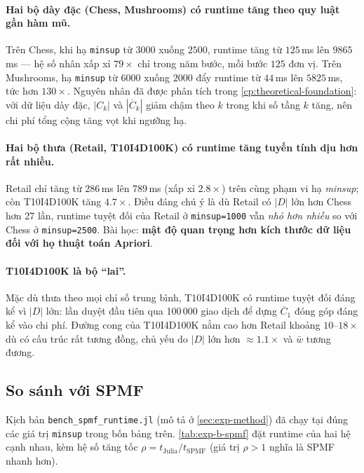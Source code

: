\paragraph{Hai bộ dày đặc (Chess, Mushrooms) có runtime tăng theo quy luật gần hàm mũ.} Trên Chess, khi hạ \texttt{minsup} từ $3000$ xuống $2500$, runtime tăng từ $125$\,ms lên $9865$\,ms --- hệ số nhân xấp xỉ $79\times$ chỉ trong năm bước, mỗi bước $125$ đơn vị. Trên Mushrooms, hạ \texttt{minsup} từ $6000$ xuống $2000$ đẩy runtime từ $44$\,ms lên $5825$\,ms, tức hơn $130\times$. Nguyên nhân đã được phân tích trong \autoref{cp:theoretical-foundation}: với dữ liệu dày đặc, $|C_k|$ và $|\overline{C}_k|$ giảm chậm theo $k$ trong khi số tầng $k$ tăng, nên chi phí tổng cộng tăng vọt khi ngưỡng hạ.

\paragraph{Hai bộ thưa (Retail, T10I4D100K) có runtime tăng tuyến tính dịu hơn rất nhiều.} Retail chỉ tăng từ $286$\,ms lên $789$\,ms (xấp xỉ $2.8\times$) trên cùng phạm vi hạ \textit{minsup}; còn T10I4D100K tăng $4.7\times$. Điều đáng chú ý là dù Retail có $|D|$ lớn hơn Chess hơn 27 lần, runtime tuyệt đối của Retail ở \texttt{minsup=1000} vẫn \emph{nhỏ hơn nhiều} so với Chess ở \texttt{minsup=2500}. Bài học: \textbf{mật độ quan trọng hơn kích thước dữ liệu đối với họ thuật toán Apriori}.

\paragraph{T10I4D100K là bộ ``lai''.} Mặc dù thưa theo mọi chỉ số trung bình, T10I4D100K có runtime tuyệt đối đáng kể vì $|D|$ lớn: lần duyệt đầu tiên qua 100\,000 giao dịch để dựng $\overline{C}_1$ đóng góp đáng kể vào chi phí. Đường cong của T10I4D100K nằm cao hơn Retail khoảng $10$--$18\times$ dù có cấu trúc rất tương đồng, chủ yếu do $|D|$ lớn hơn $\approx 1.1\times$ và $\bar{w}$ tương đương.

\subsection{So sánh với SPMF}

Kịch bản \texttt{bench\_spmf\_runtime.jl} (mô tả ở \autoref{sec:exp-method}) đã chạy tại đúng các giá trị \texttt{minsup} trong bốn bảng trên. \autoref{tab:exp-b-spmf} đặt runtime của hai hệ cạnh nhau, kèm hệ số tăng tốc $\rho = t_{\text{Julia}} / t_{\text{SPMF}}$ (giá trị $\rho > 1$ nghĩa là SPMF nhanh hơn).

